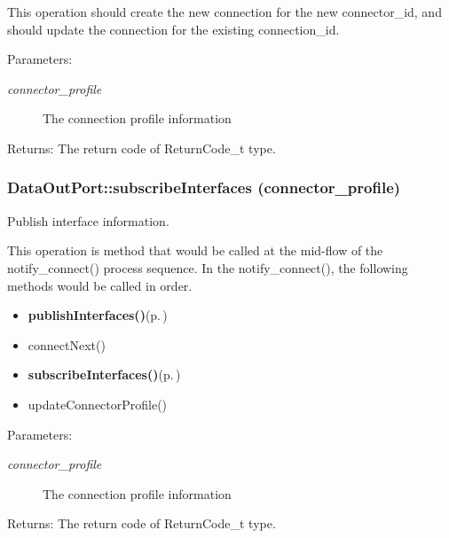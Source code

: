 This operation should create the new connection for the new connector\_\-id, and should update the connection for the existing connection\_\-id.

\begin{Desc}
\item[Parameters:]
\begin{description}
\item[{\em connector\_\-profile}]The connection profile information \end{description}
\end{Desc}
\begin{Desc}
\item[Returns:]The return code of Return\-Code\_\-t type.\end{Desc}
\subsubsection{\setlength{\rightskip}{0pt plus 5cm}Data\-Out\-Port::subscribe\-Interfaces (connector\_\-profile)}\label{classDataOutPort_DataOutPorta3}


Publish interface information. 

This operation is method that would be called at the mid-flow of the notify\_\-connect() process sequence. In the notify\_\-connect(), the following methods would be called in order.

\begin{itemize}
\item {\bf publish\-Interfaces()}{\rm (p.\,\pageref{classDataOutPort_DataOutPorta2})}\item connect\-Next()\item {\bf subscribe\-Interfaces()}{\rm (p.\,\pageref{classDataOutPort_DataOutPorta3})}\item update\-Connector\-Profile()\end{itemize}


\begin{Desc}
\item[Parameters:]
\begin{description}
\item[{\em connector\_\-profile}]The connection profile information \end{description}
\end{Desc}
\begin{Desc}
\item[Returns:]The return code of Return\-Code\_\-t type.\end{Desc}
